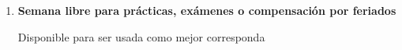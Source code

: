 \documentclass[10pt]{article}
\begin{document}
\begin{enumerate}


\item \textbf{Semana libre para prácticas, exámenes o compensación por feriados}
\vspace{-0.15cm}
\begin{description}
\item[Disponible para ser usada como mejor corresponda]
\end{description}

\end{enumerate}



\nocite{jaynes1984-bayesianBackground, mcelreath2020-rethinking, bishop2006-PRML, pearl2009-causality, cinelli2021-crashCourse, stan-userGuide, martin2022-BMCP, samaja1999-epistemologiaMetodologia }

{

}
\end{document}
